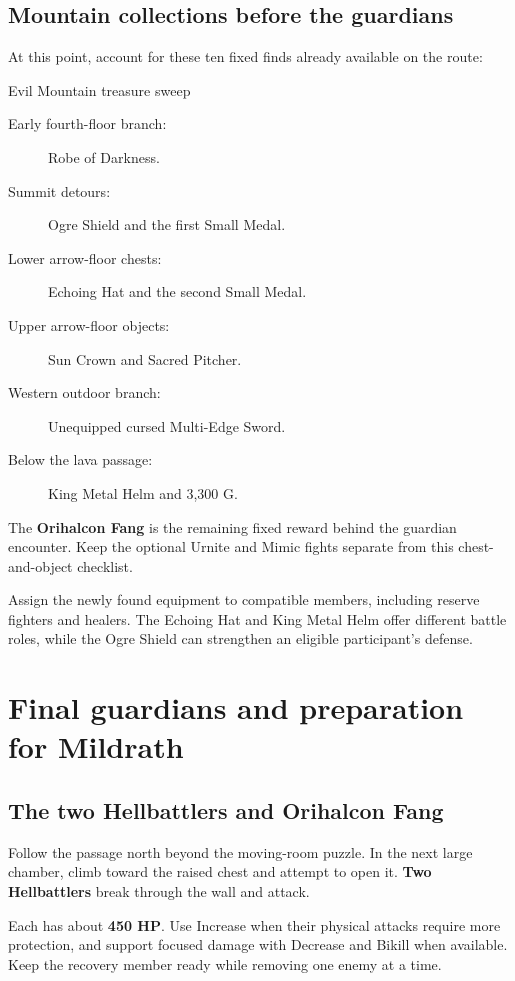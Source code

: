 \subsection*{Mountain collections before the guardians}

At this point, account for these ten fixed finds already
available on the route:
\begin{routecheck}{Evil Mountain treasure sweep}
\begin{description}
  \item[Early fourth-floor branch:] Robe of Darkness.
  \item[Summit detours:] Ogre Shield and the first Small Medal.
  \item[Lower arrow-floor chests:] Echoing Hat and the second Small Medal.
  \item[Upper arrow-floor objects:] Sun Crown and Sacred Pitcher.
  \item[Western outdoor branch:] Unequipped cursed Multi-Edge Sword.
  \item[Below the lava passage:] King Metal Helm and 3,300 G.
\end{description}
\end{routecheck}

The \textbf{Orihalcon Fang} is the remaining fixed reward
behind the guardian encounter. Keep the optional Urnite and
Mimic fights separate from this chest-and-object checklist.

Assign the newly found equipment to compatible members,
including reserve fighters and healers. The Echoing Hat and
King Metal Helm offer different battle roles, while the
Ogre Shield can strengthen an eligible participant's defense.

\section{Final guardians and preparation for Mildrath}

\subsection*{The two Hellbattlers and Orihalcon Fang}

Follow the passage north beyond the moving-room puzzle.
In the next large chamber, climb toward the raised chest
and attempt to open it. \textbf{Two Hellbattlers} break
through the wall and attack.

Each has about \textbf{450 HP}. Use Increase when their
physical attacks require more protection, and support
focused damage with Decrease and Bikill when available.
Keep the recovery member ready while removing one enemy
at a time.


